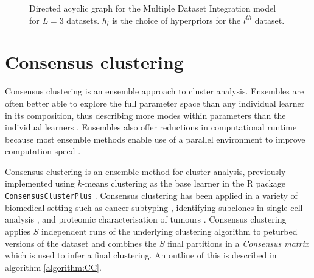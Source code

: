 \documentclass[]{article}
\begin{document}
\begin{figure}
	\caption{Directed acyclic graph for the Multiple Dataset Integration model for $L=3$ datasets. $h_l$ is the choice of hyperpriors for the $l^{th}$ dataset.}
	\label{fig:MDIDAG}
\end{figure}

\section{Consensus clustering}
Consensus clustering is an ensemble approach to cluster analysis. Ensembles are often better able to explore the full parameter space than any individual learner in its composition, thus describing more modes within parameters than the individual learners \citep{ghaemi2011review}. Ensembles also offer reductions in computational runtime because most ensemble methods enable use of a parallel environment to improve computation speed \citep{ghaemi2009survey}. 

Consensus clustering \citep{monti2003consensus} is an ensemble method for cluster analysis, previously implemented using $k$-means clustering as the base learner in the R package \texttt{ConsensusClusterPlus} \citep{wilkerson2010consensusclusterplus}. Consensus clustering has been applied in a variety of biomedical setting such as cancer subtyping \citep{lehmann2011identification, verhaak2010integrated}, identifying subclones in single cell analysis \citep{kiselev2017sc3}, and proteomic characterisation of tumours \citep{xu2020integrative}. Consensus clustering applies $S$ independent runs of the underlying clustering algorithm to peturbed versions of the dataset and combines the $S$ final partitions in a \emph{Consensus matrix} which is used to infer a final clustering. An outline of this is described in algorithm \ref{algorithm:CC}. 
\end{document}
